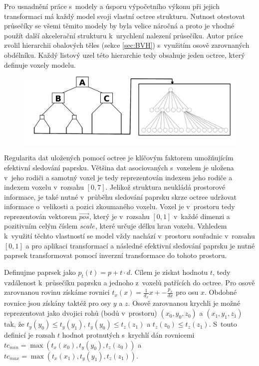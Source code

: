 Pro usnadnění práce s~modely a úsporu výpočetního výkonu při jejich transformaci má každý model svoji vlastní octree strukturu. Nutnost otestovat průsečíky se všemi těmito modely by byla velice náročná a proto je vhodné použít další akcelerační strukturu k~urychlení nalezení průsečíku. Autor práce zvolil hierarchii obalových těles (sekce \ref{sec:BVH}) s~využitím osově zarovnaných obdélníku. Každý listový uzel této hierarchie tedy obsahuje jeden octree, který definuje voxely modelu.

\begin{figure}[H]
	\centering
	\includegraphics[scale=1]{images/bvh_octree.png}
	\captionsetup{justification=centering}
	\label{fig:scene_bvh_repr}
\end{figure}

Regularita dat uložených pomocí octree je klíčovým faktorem umožňujícím efektivní sledování paprsku. Většina dat asociovaných s~voxelem je uložena v~jeho rodiči a samotný voxel je tedy reprezentován indexem jeho rodiče a indexem voxelu v~rozsahu $[0, 7]$. Jelikož struktura neukládá prostorové informace, je také nutné v~průběhu sledování paprsku skrze octree udržovat informace o~velikosti a pozici zkoumaného voxelu. Voxel je v~prostoru tedy reprezentován vektorem $\vec{pos}$, který je v~rozsahu $[0, 1]$ v~každé dimenzi a pozitivním celým číslem $scale$, které určuje délku hran voxelu. Vzhledem k~využití těchto vlastností se model vždy nachází v~prostoru souřadnic v~rozsahu $[0, 1]$ a pro aplikaci transformací a následné efektivní sledování paprsku je nutné paprsek transformovat pomocí inverzní transformace do tohoto prostoru.

Definujme paprsek jako $p_t(t) = p + t\cdot d$. Cílem je získat hodnotu $t$, tedy vzdálenost k~průsečíku paprsku a jednoho z~voxelů patřících do octree. Pro osově zarovnanou rovinu získáme rovnici $t_x(x) = \frac{1}{d_x}x + -\frac{p_x}{dx}$ pro osu $x$. Obdobné rovnice jsou získány taktéž pro osy $y$ a $z$. Osově zarovnanou krychli je možné reprezentovat jako dvojici rohů (bodů v~prostoru) $(x_0, y_0, z_0)$ a $(x_1, y_1, z_1)$ tak, že $t_y(y_0) \leq t_y(y_1)$, $t_y(y_0) \leq t_z(z_1)$ a $t_z(z_0) \leq t_z(z_1)$. S~touto definicí je rozsah $t$ hodnot protnutých s~krychlí dán rovnicemi $tc_{min} = \max(t_x(x_0), t_y(y_0), t_z(z_0))$ a $tc_{max} = \max(t_x(x_1), t_y(y_1), t_z(z_1))$.

